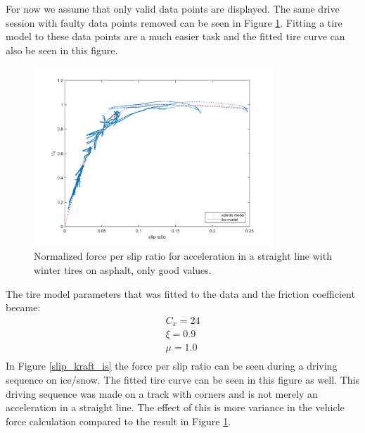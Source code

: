 For now we assume that only valid data points are displayed. The same drive session with faulty data points removed can be seen in Figure \ref{slip_kraft_ljungby}. Fitting a tire model to these data points are a much easier task and the fitted tire curve can also be seen in this figure.

\begin{figure}[h]
	\centering
	\includegraphics[width=0.8\textwidth]{Pictures/slip_kraft_ljungby}
	\caption {Normalized force per slip ratio for acceleration in a straight line with winter tires on asphalt, only good values.}
	\label{slip_kraft_ljungby}
\end{figure}

The tire model parameters that was fitted to the data and the friction coefficient became:
\begin{equation}
\label{winter_asphalt}
\begin{split}
C_{x} = 24 \\
\xi = 0.9 \\
\mu = 1.0 \\
\end{split}
\end{equation}
In Figure \ref{slip_kraft_is} the force per slip ratio can be seen during a driving sequence on ice/snow. The fitted tire curve can be seen in this figure as well. This driving sequence was made on a track with corners and is not merely an acceleration in a straight line. The effect of this is more variance in the vehicle force calculation compared to the result in Figure \ref{slip_kraft_ljungby}. 


